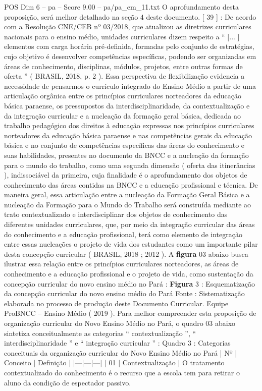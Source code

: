 \begin{textsample}{POS Dim 6 – pa – Score 9.00 – pa/pa\_em\_11.txt}
O aprofundamento desta proposição, será melhor detalhado na seção 4 deste documento. [ 39 ] : De acordo com a Resolução CNE/CEB nº 03/2018, que atualizou as diretrizes curriculares nacionais para o ensino médio, unidades curriculares dizem respeito a “ [... ] elementos com carga horária pré-definida, formadas pelo conjunto de estratégias, cujo objetivo é desenvolver competências específicas, podendo ser organizadas em áreas de conhecimento, disciplinas, módulos, projetos, entre outras formas de oferta ” ( BRASIL, 2018, p. 2 ).
Essa perspectiva de flexibilização evidencia a necessidade de pensarmos o currículo integrado do Ensino Médio a partir de uma articulação orgânica entre os princípios curriculares norteadores da educação básica paraense, os pressupostos da interdisciplinaridade, da contextualização e da integração curricular e a nucleação da formação geral básica, dedicada ao trabalho pedagógico dos direitos à educação expressas nos princípios curriculares norteadores da educação básica paraense e nas competências gerais da educação básica e no conjunto de competências específicas das áreas do conhecimento e suas habilidades, presentes no documento da BNCC e a nucleação da formação para o mundo do trabalho, como uma segunda dimensão ( oferta das itinerâncias ), indissociável da primeira, cuja finalidade é o aprofundamento dos objetos de conhecimento das áreas contidas na BNCC e a educação profissional e técnica.
De maneira geral, essa articulação entre a nucleação da Formação Geral Básica e a nucleação da Formação para o Mundo do Trabalho será construída mediante ao trato contextualizado e interdisciplinar dos objetos de conhecimento das diferentes unidades curriculares, que, por meio da integração curricular das áreas do conhecimento e a educação profissional, terá como elemento de integração entre essas nucleações o projeto de vida dos estudantes como um importante pilar desta concepção curricular ( BRASIL, 2018 ; 2012 ).
A \textbf{figura} 03 abaixo busca ilustrar essa relação entre os princípios curriculares norteadores, as áreas de conhecimento e a educação profissional e o projeto de vida, como sustentação da concepção curricular do novo ensino médio no Pará : \textbf{Figura} 3 : Esquematização da concepção curricular do novo ensino médio do Pará Fonte : Sistematização elaborada no processo de produção deste Documento Curricular.
Equipe ProBNCC – Ensino Médio ( 2019 ).
Para melhor compreender esta proposição de organização curricular do Novo Ensino Médio no Pará, o quadro 03 abaixo sintetiza conceitualmente as categorias “ contextualização ”, “ interdisciplinaridade ” e “ integração curricular ” : Quadro 3 : Categorias conceituais da organização curricular do Novo Ensino Médio no Pará | Nº | Conceito | Definição | |---|---|---| | 01 | Contextualização | O tratamento contextualizado do conhecimento é o recurso que a escola tem para retirar o aluno da condição de espectador passivo.

\end{textsample}
